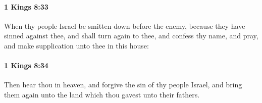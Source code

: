 		\paragraph{1 Kings 8:33} %
			\label{1KINGS-8-33}

			When thy people Israel be smitten down before the enemy, because they have sinned against thee, and shall turn again to thee, and confess thy name, and pray, and make supplication unto thee in this house:


		\paragraph{1 Kings 8:34} %
			\label{1KINGS-8-34}

			Then hear thou in heaven, and forgive the sin of thy people Israel, and bring them again unto the land which thou gavest unto their fathers.


